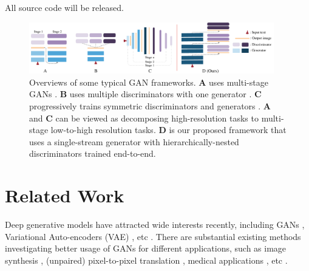 \documentclass[10pt,twocolumn,letterpaper]{article}
\begin{document}
All source code will be released.


\begin{figure}[t]
	\centering
	\includegraphics[width=0.95\textwidth]{figure/views2.pdf}
	\vspace{-.2cm}
	\caption{Overviews of some typical GAN frameworks. \textbf{A} uses multi-stage GANs \cite{han2017stackgan,denton2015deep}. \textbf{B} uses multiple discriminators with one generator \cite{durugkar2016generative,tu_etal_nips17_d2gan}. \textbf{C} progressively trains symmetric discriminators and generators \cite{Karras2017progressive,huang2016stacked}. \textbf{A} and \textbf{C} can be viewed as decomposing high-resolution tasks to multi-stage low-to-high resolution tasks.  \textbf{D} is our proposed framework that uses a single-stream generator with hierarchically-nested discriminators trained end-to-end.} \label{fig:archs-review} \vspace{-.4cm}
\end{figure}


\section{Related Work}

Deep generative models have attracted wide interests recently, including GANs \cite{goodfellow2014generative}, Variational Auto-encoders (VAE) \cite{kingma2013auto}, etc \cite{oord2016pixel}. 
There are substantial existing methods investigating better usage of GANs for different applications, such as image synthesis \cite{radford2015unsupervised, shrivastava2016learning}, (unpaired) pixel-to-pixel translation \cite{isola2016image,zhu2017unpaired}, medical applications \cite{costa2017towards}, etc \cite{ledig2016photo,huang2016stacked}.
\end{document}
